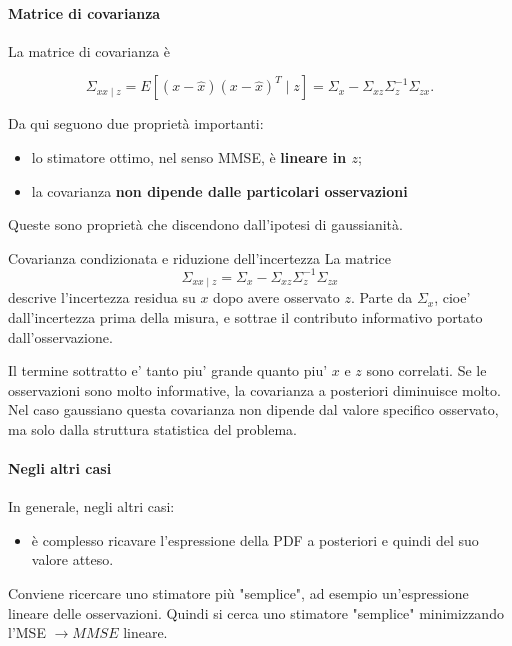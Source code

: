 \documentclass[11pt,a4paper]{article}
\begin{document}
\paragraph{Matrice di covarianza}

La matrice di covarianza è

\[
\Sigma_{xx\mid z}
=
E\!\left[
(x-\hat x)(x-\hat x)^T \mid z
\right]
=
\Sigma_x-\Sigma_{xz}\Sigma_z^{-1}\Sigma_{zx}.
\]

Da qui seguono due proprietà importanti:

\begin{itemize}
    \item lo stimatore ottimo, nel senso MMSE, è \textbf{lineare in \(z\)};
    \item la covarianza \textbf{non dipende dalle particolari osservazioni}
\end{itemize}

Queste sono proprietà che discendono dall'ipotesi di gaussianità.

\begin{spiegazione}{Covarianza condizionata e riduzione dell'incertezza}
La matrice
\[
\Sigma_{xx\mid z}
=
\Sigma_x-\Sigma_{xz}\Sigma_z^{-1}\Sigma_{zx}
\]
descrive l'incertezza residua su $x$ dopo avere osservato $z$. Parte da $\Sigma_x$, cioe' dall'incertezza prima della misura, e sottrae il contributo informativo portato dall'osservazione.

Il termine sottratto e' tanto piu' grande quanto piu' $x$ e $z$ sono correlati. Se le osservazioni sono molto informative, la covarianza a posteriori diminuisce molto. Nel caso gaussiano questa covarianza non dipende dal valore specifico osservato, ma solo dalla struttura statistica del problema.
\end{spiegazione}

\paragraph{Negli altri casi}

In generale, negli altri casi:
\begin{itemize}
    \item è complesso ricavare l'espressione della PDF a posteriori e quindi del suo valore atteso.
\end{itemize}
 Conviene ricercare uno stimatore più "semplice", ad esempio un'espressione lineare delle osservazioni.
Quindi si cerca uno stimatore "semplice" minimizzando l'MSE $\rightarrow MMSE$ lineare.
\end{document}
